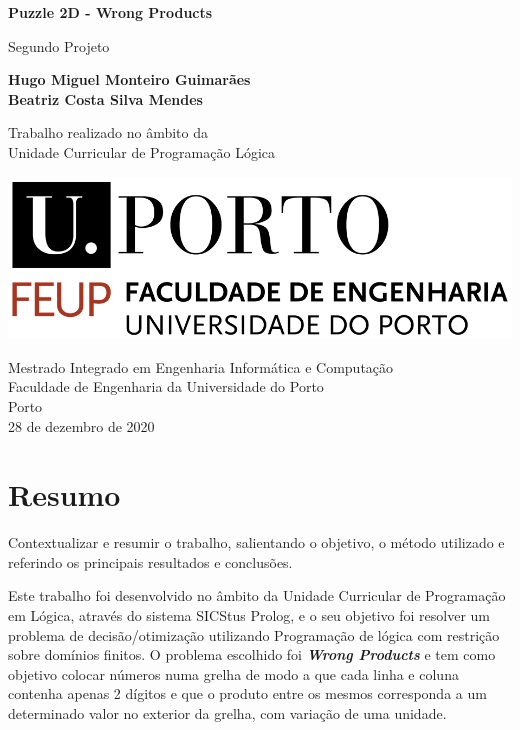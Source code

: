 \documentclass[11pt]{article}
\begin{document}
\begin{titlepage}
	\begin{center}
		\vspace*{1cm}
		
		\Large
		\textbf{Puzzle 2D - Wrong Products}
		
		\vspace{0.5cm}
		\large
		Segundo Projeto
		
		\vspace{1.5cm}
		
		\textbf{Hugo Miguel Monteiro Guimarães}\\
		\textbf{Beatriz Costa Silva Mendes}
		
		\vspace{5cm}
		
		Trabalho realizado no âmbito da\\
		Unidade Curricular de Programação Lógica
		
		\vspace{0.8cm}
	
		\includegraphics[width=0.4 \textwidth]{feup_logo.png}
		
		\vspace{1.5cm}		
		
		\large
		Mestrado Integrado em Engenharia Informática e Computação\\
		Faculdade de Engenharia da Universidade do Porto\\
		Porto\\
		28	 de dezembro de 2020
	
	\end{center}
\end{titlepage}


\pagebreak
\tableofcontents

\pagebreak


\section{Resumo} Contextualizar e resumir o trabalho, salientando o objetivo, o método
utilizado e referindo os principais resultados e conclusões.

Este trabalho foi desenvolvido no âmbito da Unidade Curricular de Programação em Lógica, através do sistema SICStus Prolog, e o seu objetivo foi resolver um problema de decisão/otimização utilizando Programação de lógica com restrição sobre domínios finitos. O problema escolhido foi \textbf{\emph{Wrong Products}} e tem como objetivo colocar números numa grelha de modo a que cada linha e coluna contenha apenas 2 dígitos e que o produto entre os mesmos corresponda a um determinado valor no exterior da grelha, com variação de uma unidade.
\end{document}
